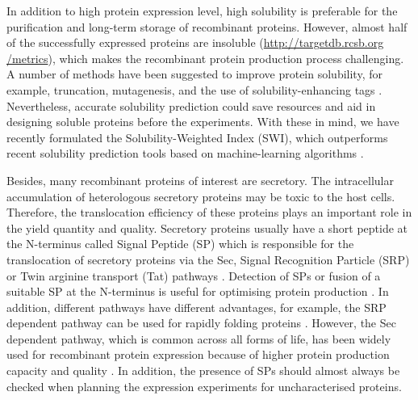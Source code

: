 In addition to high protein expression level, high solubility is
preferable for the purification and long-term storage of recombinant
proteins. However, almost half of the successfully expressed proteins
are insoluble
(\href{http://targetdb.rcsb.org/metrics}{http://targetdb.rcsb.org\\/metrics}),
which makes the recombinant protein production process challenging. A
number of methods have been suggested to improve protein solubility, for
example, truncation, mutagenesis, and the use of solubility-enhancing
tags \cite{Chan2010-mo,Costa2014-oe,Esposito2006-tj,Waldo2003-ui}. 
Nevertheless, accurate solubility prediction could save
resources and aid in designing soluble proteins before the experiments.
With these in mind, we have recently formulated the Solubility-Weighted
Index (SWI), which outperforms recent solubility prediction tools based
on machine-learning algorithms
\cite{Bhandari2020-pz}.

Besides, many recombinant proteins of interest are secretory. The
intracellular accumulation of heterologous secretory proteins may be
toxic to the host cells. Therefore, the translocation efficiency of
these proteins plays an important role in the yield quantity and
quality. Secretory proteins usually have a short peptide at the
N-terminus called Signal Peptide (SP) which is responsible for the 
translocation of secretory proteins via the Sec, Signal Recognition Particle
(SRP) or Twin arginine transport (Tat) pathways
\cite{Luirink1994-br,Palmer2012-cw,Rusch2007-it,Von_Heijne1990-sb}.
Detection of SPs or fusion of a suitable SP at the N-terminus is useful
for optimising protein production
\cite{Freudl2018-lr,Karyolaimos2020-gg,Rosano2019-sj,Zamani2015-xj}. In
addition, different pathways have different advantages, for example, the
SRP dependent pathway can be used for rapidly folding proteins
\cite{Owji2018-hg}. However, the Sec dependent
pathway, which is common across all forms of life, has been widely used
for recombinant protein expression because of higher protein production
capacity and quality
\cite{Ma2018-iz,Owji2018-hg}. In addition, the
presence of SPs should almost always be checked when planning the
expression experiments for uncharacterised proteins.


